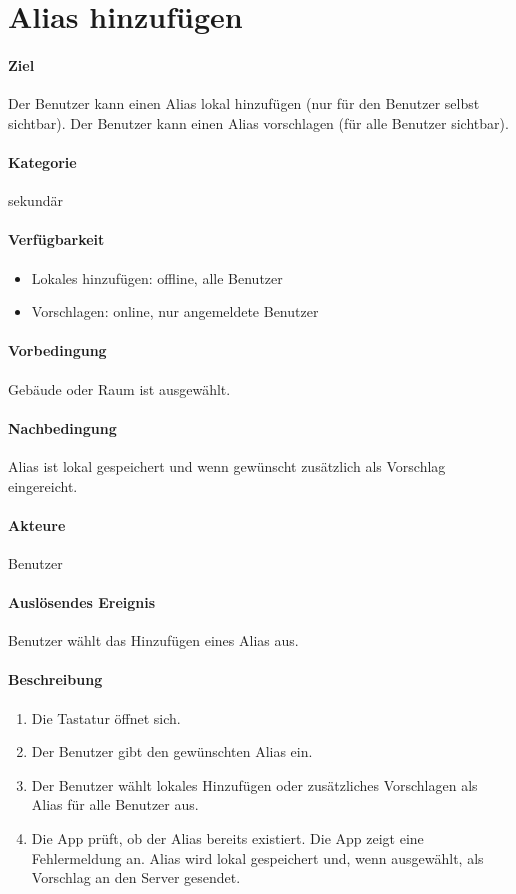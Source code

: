 \section{Alias hinzufügen}
\paragraph{Ziel}
Der Benutzer kann einen Alias lokal hinzufügen (nur für den Benutzer selbst sichtbar). Der Benutzer kann einen Alias vorschlagen (für alle Benutzer sichtbar).
\paragraph{Kategorie}
sekundär
\paragraph{Verfügbarkeit}
\begin{itemize}
    \item Lokales hinzufügen: offline, alle Benutzer
    \item Vorschlagen: online, nur angemeldete Benutzer
\end{itemize}

\paragraph{Vorbedingung}
Gebäude oder Raum ist ausgewählt.
\paragraph{Nachbedingung}
Alias ist lokal gespeichert und wenn gewünscht zusätzlich als Vorschlag eingereicht.
\paragraph{Akteure}
Benutzer
\paragraph{Auslösendes Ereignis}
Benutzer wählt das Hinzufügen eines Alias aus.
\paragraph{Beschreibung}
\begin{enumerate}
    \item Die Tastatur öffnet sich.
    \item Der Benutzer gibt den gewünschten Alias ein.
    \item Der Benutzer wählt lokales Hinzufügen oder zusätzliches Vorschlagen als Alias für alle Benutzer aus.
    \item Die App prüft, ob der Alias bereits existiert.
     Die App zeigt eine Fehlermeldung an.
     Alias wird lokal gespeichert und, wenn ausgewählt, als Vorschlag an den Server gesendet.
\end{enumerate}
